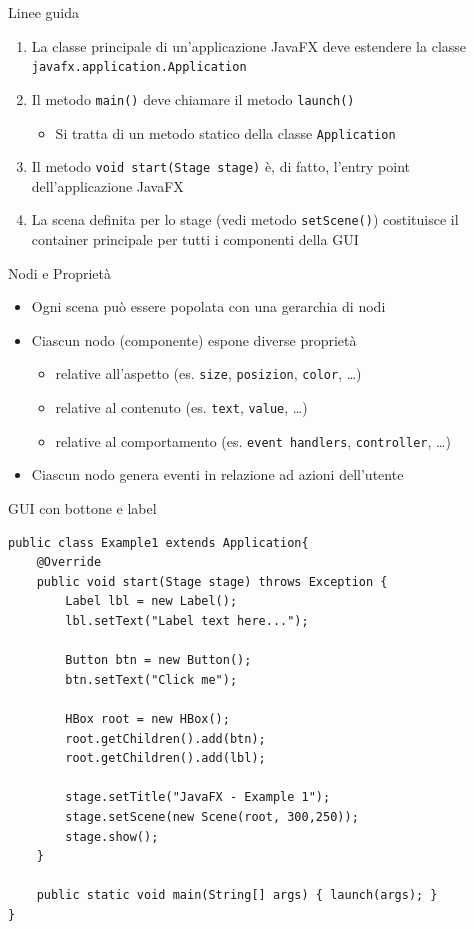 \documentclass[presentation]{beamer}
\begin{document}
\begin{frame}{Linee guida}
\begin{enumerate}\itemsep20pt
\item La classe principale di un'applicazione JavaFX deve estendere la classe \texttt{javafx.application.Application}
\item Il metodo \texttt{main()} deve chiamare il metodo \texttt{launch()}
\begin{itemize}
\item Si tratta di un metodo statico della classe \texttt{Application}
\end{itemize}
\item Il metodo \texttt{void start(Stage stage)} è, di fatto, l'entry point dell'applicazione JavaFX
\item La scena definita per lo stage (vedi metodo \texttt{setScene()}) costituisce il container principale per tutti i componenti della GUI
\end{enumerate}
\end{frame}

\begin{frame}{Nodi e Proprietà}
\begin{itemize}\itemsep10pt
\item Ogni scena può essere popolata con una gerarchia di nodi
\item Ciascun nodo (componente) espone diverse proprietà
\begin{itemize}
\item relative all'aspetto (es. \texttt{size}, \texttt{posizion}, \texttt{color}, \dots)
\item relative al contenuto (es. \texttt{text}, \texttt{value}, \dots)
\item relative al comportamento (es. \texttt{event handlers}, \texttt{controller}, \dots)
\end{itemize}
\item Ciascun nodo genera eventi in relazione ad azioni dell'utente
\end{itemize}
\end{frame}

\begin{frame}[fragile]{GUI con bottone e label}
\begin{lstlisting}
public class Example1 extends Application{
	@Override
	public void start(Stage stage) throws Exception {
		Label lbl = new Label();
		lbl.setText("Label text here...");

		Button btn = new Button();
		btn.setText("Click me");

		HBox root = new HBox();
		root.getChildren().add(btn);
		root.getChildren().add(lbl);

		stage.setTitle("JavaFX - Example 1");
		stage.setScene(new Scene(root, 300,250));
		stage.show();
	}

	public static void main(String[] args) { launch(args); }
}
\end{lstlisting}
\end{frame}
\end{document}
